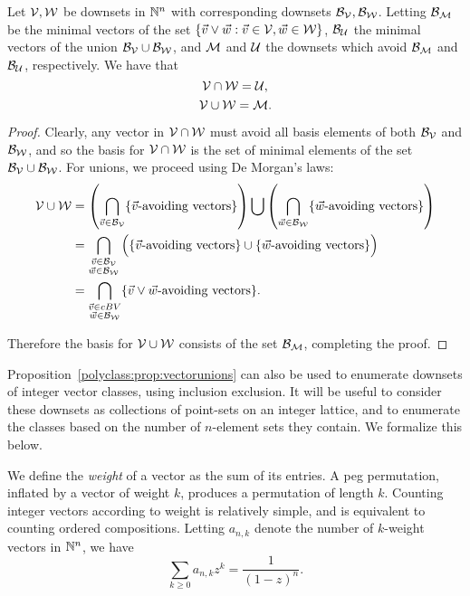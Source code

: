     \begin{proposition} \label{polyclass:prop:vectorunions}
      Let $\mathcal{V}, \mathcal{W}$ be downsets in $\mathbb{N}^n$ with corresponding downsets $\mathcal{B}_{\mathcal{V}},
      \mathcal{B}_{\mathcal{W}}$.  Letting $\mathcal{B}_{\mathcal{M}}$ be the minimal vectors of the set $\{\vec v \vee
      \vec w : \vec v \in \mathcal{V}, \vec w \in \mathcal{W} \}$, 
      $\mathcal{B}_{\mathcal{U}}$ the minimal vectors of the union $\mathcal{B}_{\mathcal{V}} \cup \mathcal{B}_{\mathcal{W}}$, and $\mathcal{M}$
      and $\mathcal{U}$ the downsets which avoid $\mathcal{B}_{\mathcal{M}}$ and $\mathcal{B}_{\mathcal{U}}$, respectively. We
      have that 
      $$ \mathcal{V} \cap \mathcal{W} = \mathcal{U}, $$
      $$ \mathcal{V} \cup \mathcal{W} = \mathcal{M} .$$
    \end{proposition}
    \begin{proof}
      Clearly, any vector in $\mathcal{V} \cap \mathcal{W}$ must avoid all basis elements of
      both $\mathcal{B}_{\mathcal{V}}$ and $\mathcal{B}_{\mathcal{W}}$, and so the basis for $\mathcal{V} \cap \mathcal{W} $ is the set
      of minimal elements of the set $\mathcal{B}_{\mathcal{V}} \cup \mathcal{B}_{\mathcal{W}}$. For
      unions, we proceed using De Morgan's laws:
      $$ \begin{aligned}
        \mathcal{V} \cup \mathcal{W}
        &= \left( \bigcap_{\vec v \in \mathcal{B}_{\mathcal{V}}} \{\vec v \mbox{-avoiding
              vectors}\}\right) \bigcup
           \left( \bigcap_{\vec w \in \mathcal{B}_{\mathcal{W}}} \{\vec w \mbox{-avoiding
              vectors}\}\right) \\
        &= \bigcap_{\substack{ \vec v \in \mathcal{B}_{\mathcal{V}} \\ \vec w \in \mathcal{B}_{\mathcal{W}} }} 
          \Big( \{\vec v \mbox{-avoiding vectors}\} 
            \cup \{\vec w \mbox{-avoiding vectors}\}\Big) \\
        &= \bigcap_{\substack{ \vec v \in cBV \\ \vec w \in \mathcal{B}_{\mathcal{W}} }} 
            \{\vec v \vee \vec w \mbox{-avoiding vectors}\}.
        \end{aligned} $$

      Therefore the basis for $\mathcal{V} \cup \mathcal{W}$ consists of the set $\mathcal{B}_{\mathcal{M}}$,
      completing the proof.
      \end{proof}

      Proposition~\ref{polyclass:prop:vectorunions} can also be used to enumerate 
      downsets of integer vector classes, using inclusion exclusion. It will be
      useful to consider these downsets as collections of point-sets on an integer
      lattice, and to enumerate the classes based on the number of $n$-element
      sets they contain. We formalize this below. 

    We define the \emph{weight} of a vector as the sum of its entries. A peg
    permutation, inflated by a vector of weight $k$, produces a permutation of
    length $k$. Counting integer vectors according to weight is relatively
    simple, and is equivalent to counting ordered compositions. Letting
    $a_{n,k}$ denote the number of $k$-weight vectors in $\mathbb{N}^n$, we have 
    $$ \sum_{k \geq 0} a_{n,k} z^k = \frac{1}{(1 - z)^n}.$$

